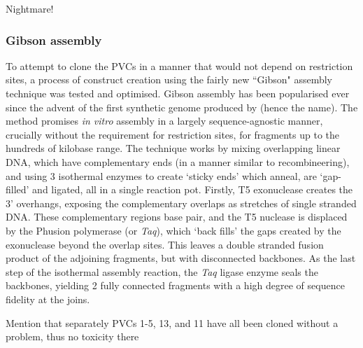 
Nightmare!


\subsubsection{Gibson assembly}
To attempt to clone the PVCs in a manner that would not depend on restriction sites, a process of construct creation using the fairly new ``Gibson" assembly technique was tested and optimised. Gibson assembly has been popularised ever since the advent of the first synthetic genome produced by \cite{Gibson2010c, Gibson2009a} (hence the name). The method promises \emph{in vitro} assembly in a largely sequence-agnostic manner, crucially without the requirement for restriction sites, for fragments up to the hundreds of kilobase range. The technique works by mixing overlapping linear DNA, which have complementary ends (in a manner similar to recombineering), and using 3 isothermal enzymes to create `sticky ends' which anneal, are `gap-filled' and ligated, all in a single reaction pot. Firstly, T5 exonuclease creates the 3' overhangs, exposing the complementary overlaps as stretches of single stranded DNA. These complementary regions base pair, and the T5 nuclease is displaced by the Phusion polymerase (or \emph{Taq}), which `back fills' the gaps created by the exonuclease beyond the overlap sites. This leaves a double stranded fusion product of the adjoining fragments, but with disconnected backbones. As the last step of the isothermal assembly reaction, the \emph{Taq} ligase enzyme seals the backbones, yielding 2 fully connected fragments with a high degree of sequence fidelity at the joins.



Mention that separately PVCs 1-5, 13, and 11 have all been cloned without a problem, thus no toxicity there



